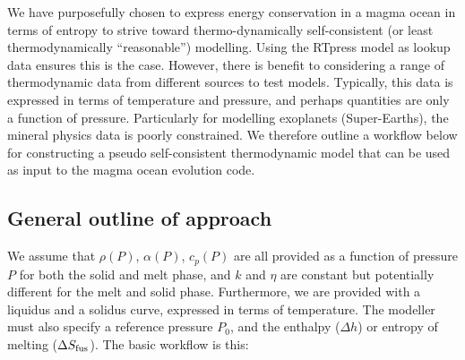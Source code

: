 We have purposefully chosen to express energy conservation in a magma ocean in terms of entropy to strive toward thermo-dynamically self-consistent (or least thermodynamically ``reasonable'') modelling.  Using the RTpress model as lookup data \citep{WB18} ensures this is the case.  However, there is benefit to considering a range of thermodynamic data from different sources to test models.  Typically, this data is expressed in terms of temperature and pressure, and perhaps quantities are only a function of pressure.  Particularly for modelling exoplanets (Super-Earths), the mineral physics data is poorly constrained.  We therefore outline a workflow below for constructing a pseudo self-consistent thermodynamic model that can be used as input to the magma ocean evolution code.

\subsection{General outline of approach}
We assume that $\rho(P)$, $\alpha(P)$, $c_p(P)$ are all provided as a function of pressure $P$ for both the solid and melt phase, and $k$ and $\eta$ are constant but potentially different for the melt and solid phase. Furthermore, we are provided with a liquidus and a solidus curve, expressed in terms of temperature.  The modeller must also specify a reference pressure $P_0$, and the enthalpy ($\Delta h$) or entropy of melting ($\Delta S_{\rm fus}$).  The basic workflow is this:
